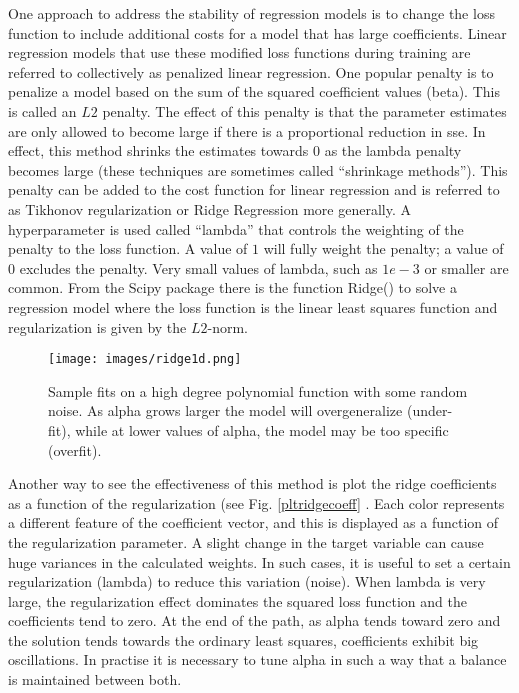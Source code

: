\noindent One approach to address the stability of regression models is to change the loss function to include additional costs for a model that has large coefficients. Linear regression models that use these modified loss functions during training are referred to collectively as penalized linear regression. One popular penalty is to penalize a model based on the sum of the squared coefficient values (beta). This is called an $L2$ penalty. The effect of this penalty is that the parameter estimates are only allowed to become large if there is a proportional reduction in \gls{sse}. In effect, this method shrinks the estimates towards $0$ as the lambda penalty becomes large (these techniques are sometimes called “shrinkage methods”). This penalty can be added to the cost function for linear regression and is referred to as Tikhonov regularization or Ridge Regression more generally. A hyperparameter is used called “lambda” that controls the weighting of the penalty to the loss function. A value of $1$ will fully weight the penalty; a value of $0$ excludes the penalty. Very small values of lambda, such as $1e-3$ or smaller are common. From the Scipy package there is the function Ridge() to solve a regression model where the loss function is the linear least squares function and regularization is given by the $L2$-norm.

\begin{figure}[H]
	\centering
	\texttt{[image: images/ridge1d.png]}
	\caption[Ridge regression 1D.]{Sample fits on a high degree polynomial function with some random noise. As alpha grows larger the model will overgeneralize (under-fit), while at lower values of alpha, the model may be too specific (overfit).}
	\label{fig:ridge1d}
\end{figure}

\noindent Another way to see the effectiveness of this method is plot the ridge coefficients as a function of the regularization (see Fig. \ref{pltridgecoeff} . Each color represents a different feature of the coefficient vector, and this is displayed as a function of the regularization parameter. A slight change in the target variable can cause huge variances in the calculated weights. In such cases, it is useful to set a certain regularization (lambda) to reduce this variation (noise). When lambda is very large, the regularization effect dominates the squared loss function and the coefficients tend to zero. At the end of the path, as alpha tends toward zero and the solution tends towards the ordinary least squares, coefficients exhibit big oscillations. In practise it is necessary to tune alpha in such a way that a balance is maintained between both.

